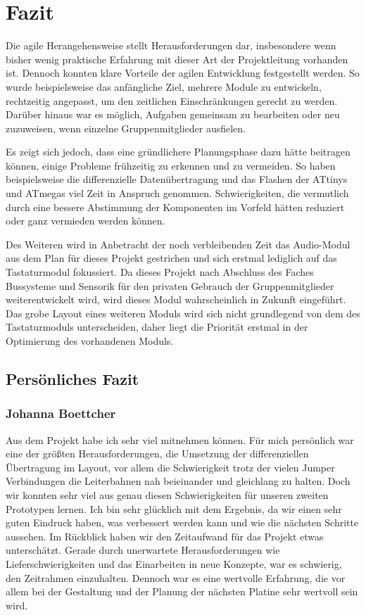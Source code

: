 \section{Fazit}
Die agile Herangehensweise stellt  Herausforderungen dar, insbesondere wenn bisher wenig praktische Erfahrung mit dieser Art der Projektleitung vorhanden ist. Dennoch konnten klare Vorteile der agilen Entwicklung festgestellt werden. So wurde beispielsweise das anfängliche Ziel, mehrere Module zu entwickeln, rechtzeitig angepasst, um den zeitlichen Einschränkungen gerecht zu werden. Darüber hinaus war es möglich, Aufgaben gemeinsam zu bearbeiten oder neu zuzuweisen, wenn einzelne Gruppenmitglieder ausfielen.

Es zeigt sich jedoch, dass eine gründlichere Planungsphase dazu hätte beitragen können, einige Probleme frühzeitig zu erkennen und zu vermeiden. So haben beispielsweise die differenzielle Datenübertragung und das Flashen der ATtinys und ATmegas viel Zeit in Anspruch genommen. Schwierigkeiten, die vermutlich durch eine bessere Abstimmung der Komponenten im Vorfeld hätten reduziert oder ganz vermieden werden können.

Des Weiteren wird in Anbetracht der noch verbleibenden Zeit das Audio-Modul aus dem Plan für dieses Projekt gestrichen und sich erstmal lediglich auf das Tastaturmodul fokussiert. Da dieses Projekt nach Abschluss des Faches \glqq Bussysteme und Sensorik\grqq{} für den privaten Gebrauch der Gruppenmitglieder weiterentwickelt wird, wird dieses Modul wahrscheinlich in Zukunft eingeführt. Das grobe Layout eines weiteren Moduls wird sich nicht grundlegend von dem des Tastaturmoduls unterscheiden, daher liegt die Priorität erstmal in der Optimierung des vorhandenen Moduls.


\subsection{Persönliches Fazit}
\subsubsection{Johanna Boettcher}
Aus dem Projekt habe ich sehr viel mitnehmen können. Für mich persönlich war eine der größten Herausforderungen, die Umsetzung der differenziellen Übertragung im Layout, vor allem die Schwierigkeit trotz der vielen Jumper Verbindungen die Leiterbahnen nah beieinander und gleichlang zu halten. Doch wir konnten sehr viel aus genau diesen Schwierigkeiten für unseren zweiten Prototypen lernen. Ich bin sehr glücklich mit dem Ergebnis, da wir einen sehr guten Eindruck haben, was verbessert werden kann und wie die nächsten Schritte aussehen. 
\newline
Im Rückblick haben wir den Zeitaufwand für das Projekt etwas unterschätzt. Gerade durch unerwartete Herausforderungen wie Lieferschwierigkeiten und das Einarbeiten in neue Konzepte, war es schwierig, den Zeitrahmen einzuhalten. Dennoch war es eine wertvolle Erfahrung, die vor allem bei der Gestaltung und der Planung der nächsten Platine sehr wertvoll sein wird.


